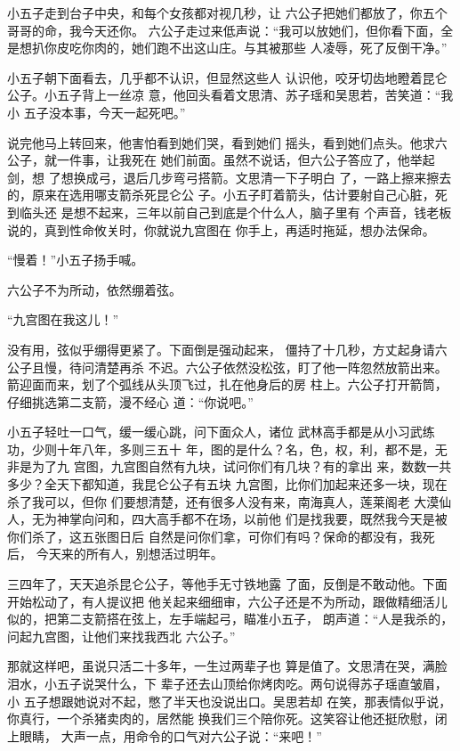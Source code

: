小五子走到台子中央，和每个女孩都对视几秒，让
六公子把她们都放了，你五个哥哥的命，我今天还你。
六公子走过来低声说：“我可以放她们，但你看下面，全
是想扒你皮吃你肉的，她们跑不出这山庄。与其被那些
人凌辱，死了反倒干净。”

小五子朝下面看去，几乎都不认识，但显然这些人
认识他，咬牙切齿地瞪着昆仑公子。小五子背上一丝凉
意，他回头看着文思清、苏子瑶和吴思若，苦笑道：“我小
五子没本事，今天一起死吧。”

说完他马上转回来，他害怕看到她们哭，看到她们
摇头，看到她们点头。他求六公子，就一件事，让我死在
她们前面。虽然不说话，但六公子答应了，他举起剑，想
了想换成弓，退后几步弯弓搭箭。文思清一下子明白
了，一路上擦来擦去的，原来在选用哪支箭杀死昆仑公
子。小五子盯着箭头，估计要射自己心脏，死到临头还
是想不起来，三年以前自己到底是个什么人，脑子里有
个声音，钱老板说的，真到性命攸关时，你就说九宫图在
你手上，再适时拖延，想办法保命。

“慢着！”小五子扬手喊。

六公子不为所动，依然绷着弦。

“九宫图在我这儿！”

没有用，弦似乎绷得更紧了。下面倒是强动起来，
僵持了十几秒，方丈起身请六公子且慢，待问清楚再杀
不迟。六公子依然没松弦，盯了他一阵忽然放箭出来。
箭迎面而来，划了个弧线从头顶飞过，扎在他身后的房
柱上。六公子打开箭筒，仔细挑选第二支箭，漫不经心
道：“你说吧。”

小五子轻吐一口气，缓一缓心跳，问下面众人，诸位
武林高手都是从小习武练功，少则十年八年，多则三五十
年，图的是什么？名，色，权，利，都不是，无非是为了九
宫图，九宫图自然有九块，试问你们有几块？有的拿出
来，数数一共多少？全天下都知道，我昆仑公子有五块
九宫图，比你们加起来还多一块，现在杀了我可以，但你
们要想清楚，还有很多人没有来，南海真人，莲莱阁老
大漠仙人，无为神掌向问和，四大高手都不在场，以前他
们是找我要，既然我今天是被你们杀了，这五张图日后
自然是问你们拿，可你们有吗？保命的都没有，我死后，
今天来的所有人，别想活过明年。

三四年了，天天追杀昆仑公子，等他手无寸铁地露
了面，反倒是不敢动他。下面开始松动了，有人提议把
他关起来细细审，六公子还是不为所动，跟做精细活儿
似的，把第二支箭搭在弦上，左手端起弓，瞄准小五子，
朗声道：“人是我杀的，问起九宫图，让他们来找我西北
六公子。”

那就这样吧，虽说只活二十多年，一生过两辈子也
算是值了。文思清在哭，满脸泪水，小五子说哭什么，下
辈子还去山顶给你烤肉吃。两句说得苏子瑶直皱眉，小
五子想跟她说对不起，憋了半天也没说出口。吴思若却
在笑，那表情似乎说，你真行，一个杀猪卖肉的，居然能
换我们三个陪你死。这笑容让他还挺欣慰，闭上眼睛，
大声一点，用命令的口气对六公子说：“来吧！”

